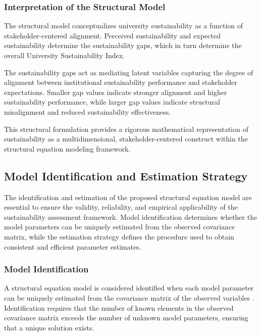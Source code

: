 \documentclass[11pt,a4paper]{article}
\begin{document}
\subsubsection{Interpretation of the Structural Model}

The structural model conceptualizes university sustainability as a function of stakeholder-centered alignment. Perceived sustainability and expected sustainability determine the sustainability gaps, which in turn determine the overall University Sustainability Index.

The sustainability gaps act as mediating latent variables capturing the degree of alignment between institutional sustainability performance and stakeholder expectations. Smaller gap values indicate stronger alignment and higher sustainability performance, while larger gap values indicate structural misalignment and reduced sustainability effectiveness.

This structural formulation provides a rigorous mathematical representation of sustainability as a multidimensional, stakeholder-centered construct within the structural equation modeling framework.



\subsection{Model Identification and Estimation Strategy}

The identification and estimation of the proposed structural equation model are essential to ensure the validity, reliability, and empirical applicability of the sustainability assessment framework. Model identification determines whether the model parameters can be uniquely estimated from the observed covariance matrix, while the estimation strategy defines the procedure used to obtain consistent and efficient parameter estimates.

\subsubsection{Model Identification}

A structural equation model is considered identified when each model parameter can be uniquely estimated from the covariance matrix of the observed variables \cite{Bollen1989,Kline2016}. Identification requires that the number of known elements in the observed covariance matrix exceeds the number of unknown model parameters, ensuring that a unique solution exists.
\end{document}
